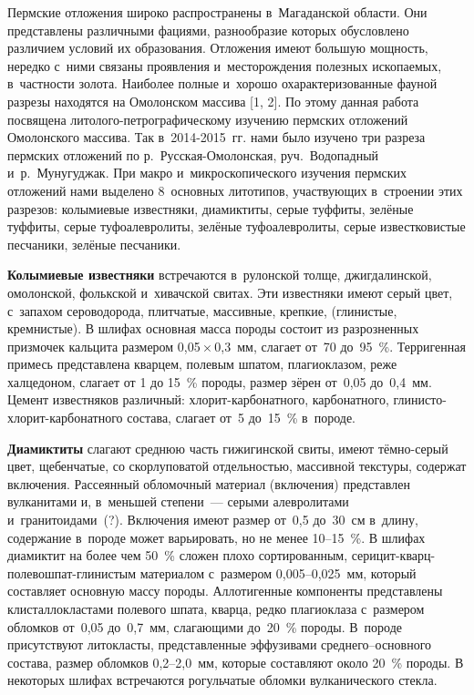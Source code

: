 




\makeProcTitleII
{}

Пермские отложения широко распространены в~Магаданской области. Они представлены различными фациями, разнообразие которых обусловлено различием условий их образования. Отложения имеют большую мощность, нередко с~ними связаны проявления и~месторождения полезных ископаемых, в~частности золота. Наиболее полные и~хорошо охарактеризованные фауной разрезы находятся на Омолонском массива [1, 2]. По этому данная работа посвящена литолого-петрографическому изучению пермских отложений Омолонского массива. Так в~2014-2015~гг. нами было изучено три разреза пермских отложений по р.~Русская-Омолонская, руч.~Водопадный и~р.~Мунугуджак. При макро и~микроскопического изучения пермских отложений нами выделено 8~основных литотипов, участвующих в~строении этих разрезов: колымиевые известняки, диамиктиты, серые туффиты, зелёные туффиты, серые туфоалевролиты, зелёные туфоалевролиты, серые известковистые песчаники, зелёные песчаники.

\textbf{Колымиевые известняки} встречаются в~рулонской толще, джигдалинской, омолонской, фолькской и~хивачской свитах. Эти известняки имеют серый цвет, с~запахом сероводорода, плитчатые, массивные, крепкие, (глинистые, кремнистые). В шлифах основная масса породы состоит из разрозненных призмочек кальцита размером 0,05\,$\times$\,0,3~мм, слагает от~70 до~95~\%. Терригенная примесь представлена кварцем, полевым шпатом, плагиоклазом, реже халцедоном, слагает от 1 до 15~\% породы, размер зёрен от~0,05 до~0,4~мм. Цемент известняков различный: хлорит-карбонатного, карбонатного, глинисто-хлорит-карбонатного состава, слагает от~5 до~15~\% в~породе.

\textbf{Диамиктиты} слагают среднюю часть гижигинской свиты, имеют тёмно-серый цвет, щебенчатые, со скорлуповатой отдельностью, массивной текстуры, содержат включения. Рассеянный обломочный материал (включения) представлен вулканитами и, в~меньшей степени~--- серыми алевролитами и~гранитоидами~(?). Включения имеют размер от~0,5 до~30~см в~длину, содержание в~породе может варьировать, но не менее 10--15~\%. В шлифах диамиктит на более чем 50~\% сложен плохо сортированным, серицит-кварц-полевошпат-глинистым материалом с~размером 0,005--0,025~мм, который составляет основную массу породы. Аллотигенные компоненты представлены клисталлокластами полевого шпата, кварца, редко плагиоклаза с~размером обломков от~0,05 до~0,7~мм, слагающими до~20~\% породы. В~породе присутствуют литокласты, представленные эффузивами среднего--основного состава, размер обломков 0,2--2,0~мм, которые составляют около 20~\% породы. В некоторых шлифах встречаются рогульчатые обломки вулканического стекла.

